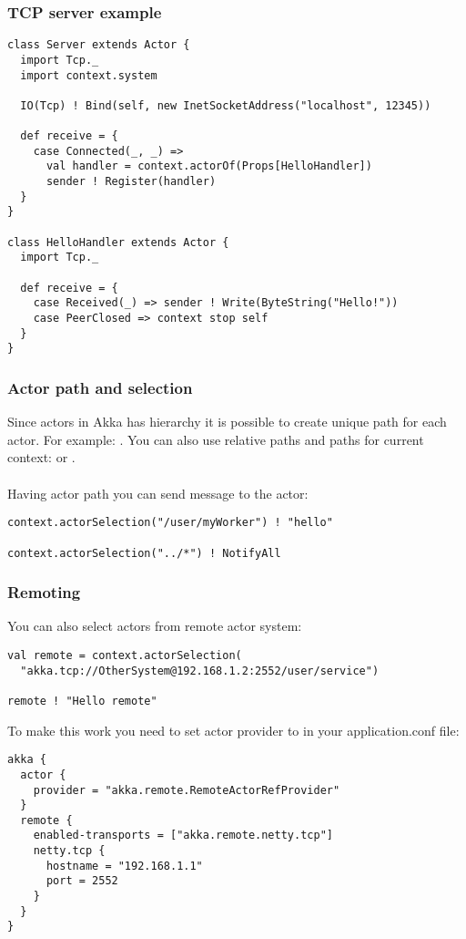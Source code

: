 \begin{frame}[fragile]
\frametitle{TCP server example}
\begin{lstlisting}
class Server extends Actor {
  import Tcp._
  import context.system

  IO(Tcp) ! Bind(self, new InetSocketAddress("localhost", 12345))

  def receive = {
    case Connected(_, _) =>
      val handler = context.actorOf(Props[HelloHandler])
      sender ! Register(handler)
  }
}

class HelloHandler extends Actor {
  import Tcp._

  def receive = {
    case Received(_) => sender ! Write(ByteString("Hello!"))
    case PeerClosed => context stop self
  }
}
\end{lstlisting}
\end{frame}

\begin{frame}[fragile]
\frametitle{Actor path and selection}
Since actors in Akka has hierarchy it is possible to create unique path for each actor.
For example: . You can also use relative paths
and paths for current context:  or .\\~\\

Having actor path you can send message to the actor:
\begin{lstlisting}
context.actorSelection("/user/myWorker") ! "hello"

context.actorSelection("../*") ! NotifyAll
\end{lstlisting}
\end{frame}

\begin{frame}[fragile]
\frametitle{Remoting}
You can also select actors from remote actor system:
\begin{lstlisting}
val remote = context.actorSelection(
  "akka.tcp://OtherSystem@192.168.1.2:2552/user/service")

remote ! "Hello remote"
\end{lstlisting}
To make this work you need to set actor provider to 
in your application.conf file:
\begin{lstlisting}
akka {
  actor {
    provider = "akka.remote.RemoteActorRefProvider"
  }
  remote {
    enabled-transports = ["akka.remote.netty.tcp"]
    netty.tcp {
      hostname = "192.168.1.1"
      port = 2552
    }
  }
}
\end{lstlisting}
\end{frame}




